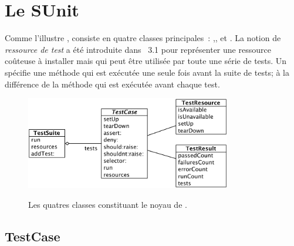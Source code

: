 \documentclass[a4paper,10pt,twoside]{book}
\begin{document}
\section{Le \frmwk SUnit}

Comme l'illustre , \sunit consiste en quatre classes 
principales~: ,,  et .
La notion de \emph{ressource de test} a été introduite dans \sunit~3.1 pour représenter 
une ressource coûteuse à installer mais qui peut être utilisée par toute une série de tests. 
Un  spécifie une méthode  qui est exécutée une seule fois avant 
la suite de tests; à la différence de la méthode  qui est exécutée avant chaque test.

\begin{figure}[htb]
  \begin{center}
		{\includegraphics[width=0.8\textwidth]{sunit-classes}}
	\caption{Les quatres classes constituant le noyau de \SUnit.}
	\label{fig:sunit-classes}
  \end{center}
\end{figure}


\subsection{TestCase}
\end{document}
